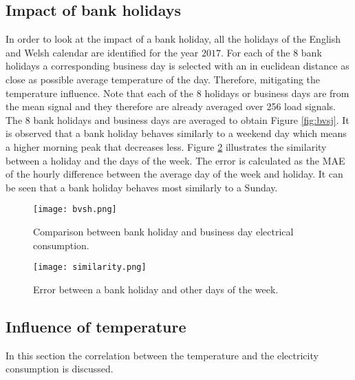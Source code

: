 \subsection{Impact of bank holidays}\label{s:Impact of holidays}
In order to look at the impact of a bank holiday, all the holidays of the English and Welsh calendar are identified for the year $ 2017 $. For each of the $ 8 $ bank holidays a corresponding business day is selected with an in euclidean distance as close as possible average temperature of the day. Therefore, mitigating the temperature influence. Note that each of the 8 holidays or business days are from the mean signal and they therefore are already averaged over 256 load signals. The 8 bank holidays and business days are averaged to obtain Figure \ref{fig:bvsj}. It is observed that a bank holiday behaves similarly to a weekend day which means a higher morning peak that decreases less. Figure \ref{fig:sim_weekdays} illustrates the similarity between a holiday and the days of the week. The error is calculated as the MAE of the hourly difference between the average day of the week and holiday. It can be seen that a bank holiday behaves most similarly to a Sunday.

\begin{figure}[h!]
	\centering
	\texttt{[image: bvsh.png]}
	\caption{Comparison between bank holiday and business day electrical consumption.}
	\label{fig:bvsh}
\end{figure}

\begin{figure}[h!]
	\centering
	\texttt{[image: similarity.png]}
	\caption{Error between a bank holiday and other days of the week.}
	\label{fig:sim_weekdays}
\end{figure}


\subsection{Influence of temperature}
In this section the correlation between the temperature and the electricity consumption is discussed.\\


